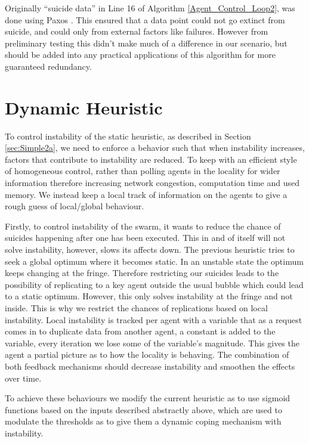 \documentclass{UoYCSproject}
\begin{document}
Originally “suicide data” in Line 16 of Algorithm \ref{Agent_Control_Loop2}, was done using Paxos \cite{Paxos}.
This ensured that a data point could not go extinct from suicide, and could only from external factors like failures.
However from preliminary testing this didn’t make much of a difference in our scenario, but should be added into any practical applications of this algorithm for more guaranteed redundancy.

\section{Dynamic Heuristic}
\label{sec:Simple3}

To control instability of the static heuristic, as described in Section \ref{sec:Simple2a}, we need to enforce a behavior such that when instability increases, factors that contribute to instability are reduced. 
To keep with an efficient style of homogeneous control, rather than polling agents in the locality for wider information therefore increasing network congestion, computation time and used memory. 
We instead keep a local track of information on the agents to give a rough guess of local/global behaviour. 

Firstly, to control instability of the swarm, it wants to reduce the chance of suicides happening after one has been executed. 
This in and of itself will not solve instability, however, slows its affects down. 
The previous heuristic tries to seek a global optimum where it becomes static. 
In an unstable state the optimum keeps changing at the fringe. 
Therefore restricting our suicides leads to the possibility of replicating to a key agent outside the usual bubble which could lead to a static optimum. 
However, this only solves instability at the fringe and not inside. 
This is why we restrict the chances of replications based on local instability. 
Local instability is tracked per agent with a variable that as a request comes in to duplicate data from another agent, a constant is added to the variable, every iteration we lose some of the variable's magnitude. 
This gives the agent a partial picture as to how the locality is behaving. 
The combination of both feedback mechanisms should decrease instability and smoothen the effects over time.

To achieve these behaviours we modify the current heuristic as to use sigmoid functions based on the inputs described abstractly above, which are used to modulate the thresholds as to give them a dynamic coping mechanism with instability.
\end{document}
